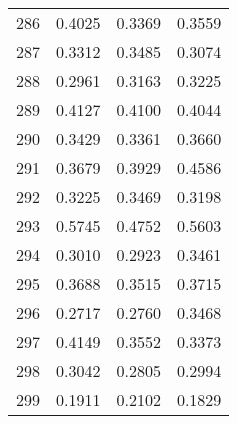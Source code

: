 \begin{table}[ht]
\begin{tabular}{|c|c|c|c|}
286  &  0.4025   &  0.3369   &  0.3559 \\ 
287  &  0.3312   &  0.3485   &  0.3074 \\ 
288  &  0.2961   &  0.3163   &  0.3225 \\ 
289  &  0.4127   &  0.4100   &  0.4044 \\ 
290  &  0.3429   &  0.3361   &  0.3660 \\ 
291  &  0.3679   &  0.3929   &  0.4586 \\ 
292  &  0.3225   &  0.3469   &  0.3198 \\ 
293  &  0.5745   &  0.4752   &  0.5603 \\ 
294  &  0.3010   &  0.2923   &  0.3461 \\ 
295  &  0.3688   &  0.3515   &  0.3715 \\ 
296  &  0.2717   &  0.2760   &  0.3468 \\ 
297  &  0.4149   &  0.3552   &  0.3373 \\ 
298  &  0.3042   &  0.2805   &  0.2994 \\ 
299  &  0.1911   &  0.2102   &  0.1829 \\ 
\hline
 \end{tabular}
  \end{table}


